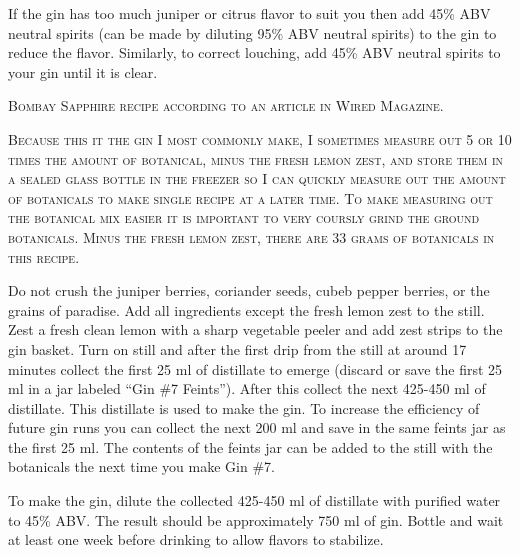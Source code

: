 \documentclass[letterpaper]{recipePMG}
\begin{document}
If the gin has too much juniper or citrus flavor to suit you then 
add 45\% ABV neutral spirits (can be made by diluting 95\% ABV neutral spirits) to the gin to reduce the flavor. Similarly, to correct louching, add 45\% ABV neutral spirits to your gin until it is clear.



\newpage

\label{GinNumber7}


\textsc{Bombay Sapphire recipe according to an article in Wired Magazine.}

\textsc{Because this it the gin I most commonly make, I sometimes measure out 5 or 10 times the amount of botanical,  minus the fresh lemon zest, and store them in a sealed glass bottle in the freezer so I can quickly measure out the amount of botanicals to make single recipe at a later time.  To make measuring out the botanical mix easier it is important to very coursly grind the ground botanicals.    Minus the fresh lemon zest, there are 33 grams of botanicals in this recipe.}

Do not crush the juniper berries, coriander seeds, cubeb pepper berries, or the grains of paradise. Add all ingredients except the fresh lemon zest to the still.   Zest a fresh clean lemon with a sharp vegetable peeler and add zest strips to the gin basket.  Turn on still and after the first drip from the still at around 17 minutes collect the first 25 ml of distillate to emerge (discard or save the first 25 ml in a jar labeled ``Gin \#7 Feints'').  After this collect the next 425-450 ml of distillate. This distillate is used to make the gin. To increase the efficiency of future gin runs you can collect the next 200 ml and save in the same feints jar as the first 25 ml. The contents of the feints jar can be added to the still with the botanicals the next time you make Gin \#7.

To make the gin, dilute the collected 425-450 ml of distillate with purified water to 45\% ABV. The result should be approximately 750 ml of gin. Bottle and wait at least one week before drinking to allow flavors to stabilize.
\end{document}
